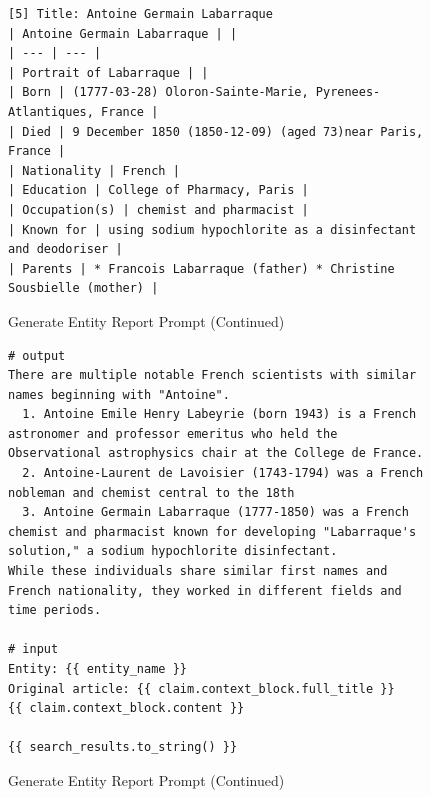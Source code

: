 \documentclass[11pt]{article}
\begin{document}
\begin{figure}[htb]
\begin{lstlisting}
[5] Title: Antoine Germain Labarraque
| Antoine Germain Labarraque | |
| --- | --- |
| Portrait of Labarraque | |
| Born | (1777-03-28) Oloron-Sainte-Marie, Pyrenees-Atlantiques, France |
| Died | 9 December 1850 (1850-12-09) (aged 73)near Paris, France |
| Nationality | French |
| Education | College of Pharmacy, Paris |
| Occupation(s) | chemist and pharmacist |
| Known for | using sodium hypochlorite as a disinfectant and deodoriser |
| Parents | * Francois Labarraque (father) * Christine Sousbielle (mother) |
\end{lstlisting}

\caption{Generate Entity Report Prompt (Continued)} \label{lst:generate_entity_report_2}
\end{figure}

\begin{figure}[htb]
\begin{lstlisting}
# output
There are multiple notable French scientists with similar names beginning with "Antoine".
  1. Antoine Emile Henry Labeyrie (born 1943) is a French astronomer and professor emeritus who held the Observational astrophysics chair at the College de France.
  2. Antoine-Laurent de Lavoisier (1743-1794) was a French nobleman and chemist central to the 18th
  3. Antoine Germain Labarraque (1777-1850) was a French chemist and pharmacist known for developing "Labarraque's solution," a sodium hypochlorite disinfectant.
While these individuals share similar first names and French nationality, they worked in different fields and time periods.

# input
Entity: {{ entity_name }}
Original article: {{ claim.context_block.full_title }}
{{ claim.context_block.content }}

{{ search_results.to_string() }}
\end{lstlisting}

\caption{Generate Entity Report Prompt (Continued)} \label{lst:generate_entity_report_3}
\end{figure}
\end{document}
